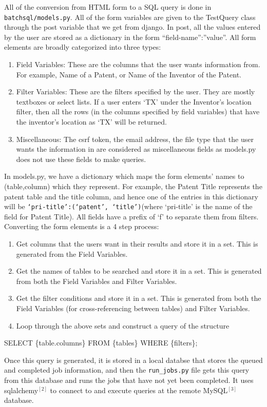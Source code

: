 All of the conversion from HTML form to a SQL query is done in \verb`batchsql/models.py`. All of the form variables are given to the TestQuery class through the post variable that we get from django. In post, all the values entered by the user are stored as a dictionary in the form {“field-name”:”value”}. All form elements are broadly categorized into three types: 

\begin{enumerate}
\item Field Variables: These are the columns that the user wants information from. For example, Name of a Patent, or Name of the Inventor of the Patent.
\item Filter Variables: These are the filters specified by the user. They are mostly textboxes or select lists. If a user enters ‘TX’ under the Inventor’s location filter, then all the rows (in the columns specified by field variables) that have the inventor’s location as ‘TX’ will be returned.
\item Miscellaneous: The csrf token, the email address, the file type that the user wants the information in are considered as miscellaneous fields as models.py does not use these fields to make queries.
\end{enumerate}

	In models.py, we have a dictionary which maps the form elements’ names to (table,column) which they represent. For example, the Patent Title represents the patent table and the title column, and hence one of the entries in this dictionary will be \verb`‘pri-title’:(‘patent’, ‘title’)`(where ‘pri-title’ is the name of the field for Patent Title). All fields have a prefix of ‘f’ to separate them from filters. Converting the form elements is a 4 step process:

\begin{enumerate}
\item Get columns that the users want in their results and store it in a set. This is generated from the Field Variables.
\item Get the names of tables to be searched and store it in a set. This is generated from both the Field Variables and Filter Variables.
\item Get the filter conditions and store it in a set. This is generated from both the Field Variables (for cross-referencing between tables) and Filter Variables.
\item Loop through the above sets and construct a query of the structure\\
\end{enumerate}

\begin{center}
SELECT \{table.columns\} FROM \{tables\} WHERE \{filters\};
\end{center}

	Once this query is generated, it is stored in a local databse that stores the queued and completed job information, and then the \verb`run_jobs.py` file gets this query from this database and runs the jobs that have not yet been completed. It uses sqlalchemy$^{[2]}$ to connect  to and execute queries at the remote MySQL$^{[3]}$ database.
